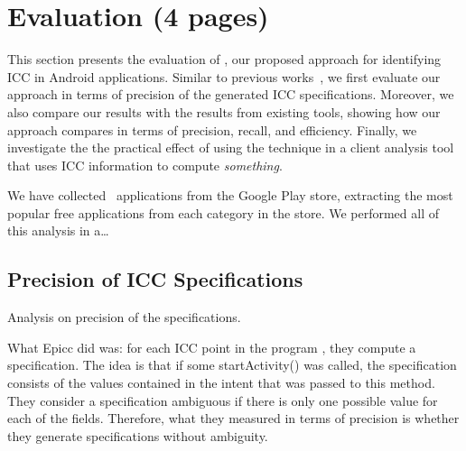\section{Evaluation (4 pages)}



This section presents the evaluation of \tname{}, our proposed approach for identifying ICC in Android applications. Similar to previous works~\cite{epicc}, we first evaluate our approach in terms of precision of the generated ICC specifications. Moreover, we also compare our results with the results from existing tools, showing how our approach compares in terms of precision, recall, and efficiency. Finally, we investigate the the practical effect of using the technique in a client analysis tool that uses ICC information to compute \emph{something}. 

We have collected \totalapps{}~applications from the Google Play store, extracting the most popular free applications from each category in the store. We performed all of this analysis in a\ldots {}

\subsection{Precision of ICC Specifications}

Analysis on precision of the specifications. 

What Epicc did was: for each ICC point in the program , they compute a specification. The
idea is that if some startActivity() was called, the specification
consists of the values contained in the intent that was passed to this
method. They consider a specification ambiguous if there is only one
possible value for each of the fields. Therefore, what they measured
in terms of precision is whether they generate specifications without
ambiguity. 

